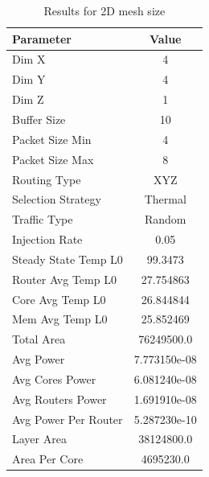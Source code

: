 \documentclass[conference]{IEEEtran}
\begin{document}
	\begin{table}[h!]
		\centering		
		\begin{tabular}{|l|c|}
			\hline
			\textbf{Parameter} & \textbf{Value} \\ \hline
			Dim X & 4 \\ \hline
			Dim Y & 4 \\ \hline
			Dim Z & 1 \\ \hline
			Buffer Size & 10 \\ \hline
			Packet Size Min & 4 \\ \hline
			Packet Size Max & 8 \\ \hline
			Routing Type & XYZ \\ \hline
			Selection Strategy & Thermal \\ \hline
			Traffic Type & Random \\ \hline
			Injection Rate & 0.05 \\ \hline
			Steady State Temp L0 & 99.3473 \\ \hline
			Router Avg Temp L0 & 27.754863 \\ \hline
			Core Avg Temp L0 & 26.844844 \\ \hline
			Mem Avg Temp L0 & 25.852469 \\ \hline
			Total Area & 76249500.0 \\ \hline
			Avg Power & 7.773150e-08 \\ \hline
			Avg Cores Power & 6.081240e-08 \\ \hline
			Avg Routers Power & 1.691910e-08 \\ \hline
			Avg Power Per Router & 5.287230e-10 \\ \hline
			Layer Area & 38124800.0 \\ \hline
			Area Per Core & 4695230.0 \\ \hline
		\end{tabular}
		\caption{Results for 2D mesh size}
		\label{tab:2d_results}
	\end{table}
\end{document}
